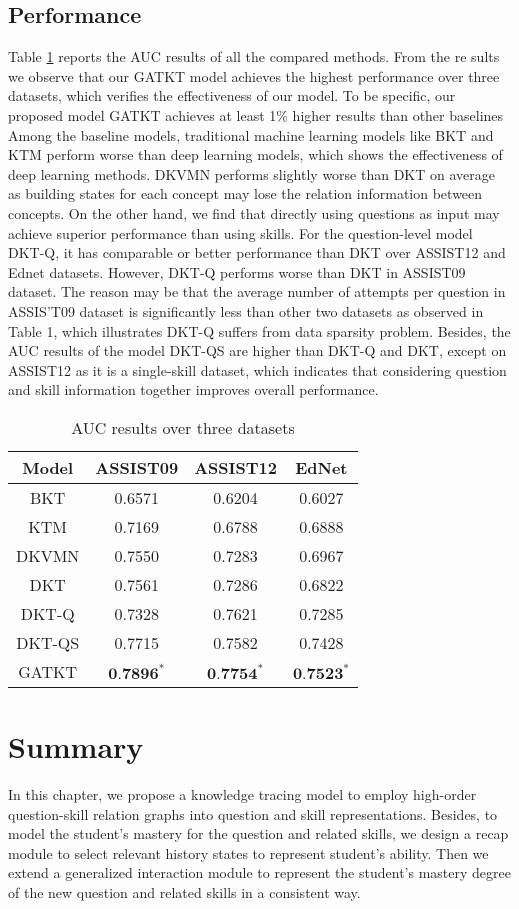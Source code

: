 \subsection{Performance}
Table \ref{ch2-tb2} reports the AUC results of all the compared methods. From the re sults we observe that our GATKT model achieves the highest performance over three datasets, which verifies the effectiveness of our model. To be specific, our proposed model GATKT achieves at least 1\% higher results than other baselines Among the baseline models, traditional machine learning models like BKT and KTM perform worse than deep learning models, which shows the effectiveness of deep learning methods. DKVMN performs slightly worse than DKT on average as building states for each concept may lose the relation information between concepts. On the other hand, we find that directly using questions as input may achieve superior performance than using skills. For the question-level model DKT-Q, it has comparable or better performance than DKT over ASSIST12 and Ednet datasets. However, DKT-Q performs worse than DKT in ASSIST09 dataset. The reason may be that the average number of attempts per question in ASSIS'T09 dataset is significantly less than other two datasets as observed in Table 1, which illustrates DKT-Q suffers from data sparsity problem. Besides, the AUC results of the model DKT-QS are higher than DKT-Q and DKT, except on ASSIST12 as it is a single-skill dataset, which indicates that considering question and skill information together improves overall performance.

\begin{table}[h]
	\centering
	\caption{AUC results over three datasets}
	\label{ch2-tb2}
	\begin{tabular}{cccc}
		\hline Model & ASSIST09 & ASSIST12 & EdNet \\
		\hline BKT & 0.6571 & 0.6204 & 0.6027 \\
		KTM & 0.7169 & 0.6788 & 0.6888 \\
		DKVMN & 0.7550 & 0.7283 & 0.6967 \\
		DKT & 0.7561 & 0.7286 & 0.6822 \\
		\hline DKT-Q & 0.7328 & 0.7621 & 0.7285 \\
		DKT-QS & 0.7715 & 0.7582 & 0.7428 \\
		\hline GATKT & $\mathbf{0 . 7 8 9 6}^{*}$ & $\mathbf{0 . 7 7 5 4}^{*}$ & $\mathbf{0 . 7 5 2 3}^{*}$ \\
		\hline	
	\end{tabular}
\end{table}



\section{Summary}
In this chapter, we propose a knowledge tracing model to employ high-order question-skill relation graphs into question and skill representations. Besides, to model the student's mastery for the question and related skills, we design a recap module to select relevant history states to represent student's ability. Then we extend a generalized interaction module to represent the student's mastery degree of the new question and related skills in a consistent way. 
